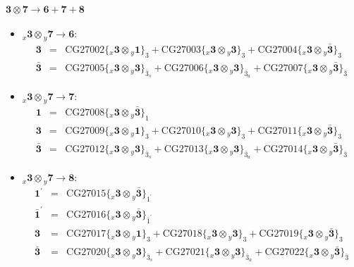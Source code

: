 \documentclass[english]{article}
\newcommand{\rep}[1]{\mathbf{#1}}
\newcommand{\repx}[2]{{}_{#2}\mathbf{#1}}
\newcommand{\subcg}[3]{\big\{ \repx{#1}{x}\otimes\repx{#2}{y}\big\}^{}_{#3}}
\begin{document}
\paragraph*{\Large $\rep{3}\otimes\rep{7}\to\rep{6}+\rep{7}+\rep{8}$}
\begin{itemize}
\item $\repx{3}{x}\otimes\repx{7}{y}\to\rep{6}$:
\begin{eqnarray*}
\rep{3} &=& \text{CG27002}\subcg{3}{1}{3}+\text{CG27003}\subcg{3}{3}{3}+\text{CG27004}\subcg{3}{\bar{3}}{3}
\\
\rep{\bar{3}} &=& \text{CG27005}\subcg{3}{3}{\bar{3}_{s}}+\text{CG27006}\subcg{3}{3}{\bar{3}_{a}}+\text{CG27007}\subcg{3}{\bar{3}}{\bar{3}}
\end{eqnarray*}
\item $\repx{3}{x}\otimes\repx{7}{y}\to\rep{7}$:
\begin{eqnarray*}
\rep{1} &=& \text{CG27008}\subcg{3}{\bar{3}}{1}
\\
\rep{3} &=& \text{CG27009}\subcg{3}{1}{3}+\text{CG27010}\subcg{3}{3}{3}+\text{CG27011}\subcg{3}{\bar{3}}{3}
\\
\rep{\bar{3}} &=& \text{CG27012}\subcg{3}{3}{\bar{3}_{s}}+\text{CG27013}\subcg{3}{3}{\bar{3}_{a}}+\text{CG27014}\subcg{3}{\bar{3}}{\bar{3}}
\end{eqnarray*}
\item $\repx{3}{x}\otimes\repx{7}{y}\to\rep{8}$:
\begin{eqnarray*}
\rep{1^{\prime}} &=& \text{CG27015}\subcg{3}{\bar{3}}{1^{\prime}}
\\
\rep{\bar{1}^{\prime}} &=& \text{CG27016}\subcg{3}{\bar{3}}{\bar{1}^{\prime}}
\\
\rep{3} &=& \text{CG27017}\subcg{3}{1}{3}+\text{CG27018}\subcg{3}{3}{3}+\text{CG27019}\subcg{3}{\bar{3}}{3}
\\
\rep{\bar{3}} &=& \text{CG27020}\subcg{3}{3}{\bar{3}_{s}}+\text{CG27021}\subcg{3}{3}{\bar{3}_{a}}+\text{CG27022}\subcg{3}{\bar{3}}{\bar{3}}
\end{eqnarray*}
\end{itemize}
\end{document}

